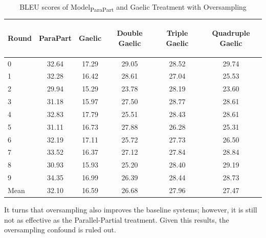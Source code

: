 \documentclass[final]{ua-thesis}
\numberwithin{equation}{section}
\begin{document}
\begin{table}[ht]
\centering
\begin{tabular}{lccccc}
  \hline
\begin{sideways} Round \end{sideways} & \begin{sideways} ParaPart \end{sideways} & \begin{sideways} Gaelic \end{sideways} & \begin{sideways} Double Gaelic  \end{sideways} & \begin{sideways} Triple Gaelic \end{sideways} & \begin{sideways} Quadruple Gaelic \end{sideways} \\ 
  \hline
0 & 32.64 & 17.29 & 29.05 & 28.52 & 29.74 \\ 
  1 & 32.28 & 16.42 & 28.61 & 27.04 & 25.53 \\ 
  2 & 29.94 & 15.29 & 23.78 & 28.19 & 23.60 \\ 
  3 & 31.18 & 15.97 & 27.50 & 28.77 & 28.61 \\ 
  4 & 32.83 & 17.79 & 25.51 & 28.43 & 28.61 \\ 
  5 & 31.11 & 16.73 & 27.88 & 26.28 & 25.31 \\ 
  6 & 32.19 & 17.11 & 25.72 & 27.73 & 26.50 \\ 
  7 & 33.52 & 16.37 & 27.12 & 27.84 & 28.84 \\ 
  8 & 30.93 & 15.93 & 25.20 & 28.40 & 29.19 \\ 
  9 & 34.35 & 16.99 & 26.39 & 28.44 & 28.73 \\ 
   \hline
Mean & 32.10 & 16.59 & 26.68 & 27.96 & 27.47 \\ 
   \hline
\end{tabular}
\caption{BLEU scores of Model\textsubscript{ParaPart} and Gaelic Treatment with Oversampling} 
\label{Table:over}
\end{table}
It turns that oversampling also improves the baseline systems; however, it is still not as effective as the Parallel-Partial treatment. Given this results, the oversampling confound is ruled out.
\end{document}
